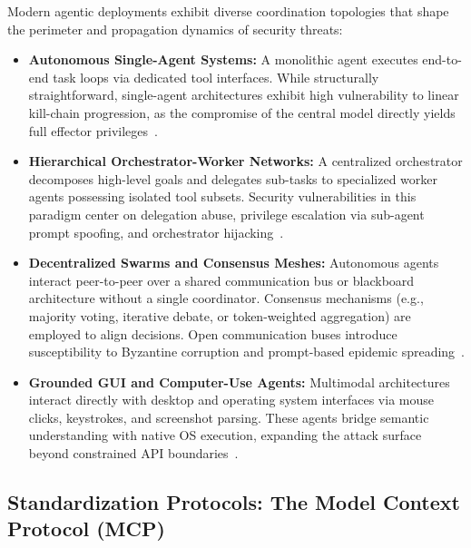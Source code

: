 Modern agentic deployments exhibit diverse coordination topologies that shape the perimeter and propagation dynamics of security threats:
\begin{itemize}
    \item \textbf{Autonomous Single-Agent Systems:} A monolithic agent executes end-to-end task loops via dedicated tool interfaces. While structurally straightforward, single-agent architectures exhibit high vulnerability to linear kill-chain progression, as the compromise of the central model directly yields full effector privileges~\cite{dehghantanha2026sok, liu2024demystifying}.
    \item \textbf{Hierarchical Orchestrator-Worker Networks:} A centralized orchestrator decomposes high-level goals and delegates sub-tasks to specialized worker agents possessing isolated tool subsets. Security vulnerabilities in this paradigm center on delegation abuse, privilege escalation via sub-agent prompt spoofing, and orchestrator hijacking~\cite{narajala2025securing}.
    \item \textbf{Decentralized Swarms and Consensus Meshes:} Autonomous agents interact peer-to-peer over a shared communication bus or blackboard architecture without a single coordinator. Consensus mechanisms (e.g., majority voting, iterative debate, or token-weighted aggregation) are employed to align decisions. Open communication buses introduce susceptibility to Byzantine corruption and prompt-based epidemic spreading~\cite{dewitt2025open, gu2024agent, chen2024blockagents}.
    \item \textbf{Grounded GUI and Computer-Use Agents:} Multimodal architectures interact directly with desktop and operating system interfaces via mouse clicks, keystrokes, and screenshot parsing. These agents bridge semantic understanding with native OS execution, expanding the attack surface beyond constrained API boundaries~\cite{xie2024osworld}.
\end{itemize}

\subsection{Standardization Protocols: The Model Context Protocol (MCP)}
\label{subsec:mcp_arch}

